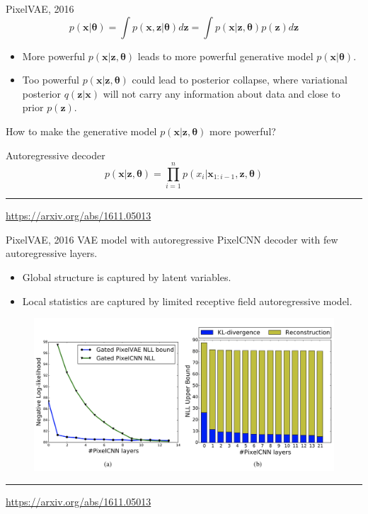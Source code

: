 \documentclass{beamer}
\newcommand{\bx}{\mathbf{x}}
\newcommand{\bz}{\mathbf{z}}
\newcommand{\btheta}{\boldsymbol{\theta}}
\begin{document}
\begin{frame}{PixelVAE, 2016}
	\[
	    p(\bx | \btheta) = \int p(\bx, \bz | \btheta) d \bz = \int p(\bx | \bz, \btheta) p(\bz) d \bz 
	\]
	\begin{itemize}
		\item More powerful $p(\bx | \bz, \btheta)$ leads to more powerful generative model $p(\bx | \btheta)$.
		\item Too powerful $p(\bx | \bz, \btheta)$ could lead to posterior collapse, where variational posterior $q(\bz | \bx)$ will not carry any information about data and close to prior $p(\bz)$.
	\end{itemize}
	How to make the generative model $p(\bx | \bz, \btheta)$ more powerful?
	\begin{block}{Autoregressive decoder}
	\[
	    p(\bx | \bz , \btheta) = \prod_{i=1}^n p(x_i | \bx_{1:i - 1}, \bz , \btheta)
	\]
	\end{block}
	
	\vfill
	\hrule\medskip
	{\scriptsize \href{https://arxiv.org/abs/1611.05013}{https://arxiv.org/abs/1611.05013}}
\end{frame}
\begin{frame}{PixelVAE, 2016}
	VAE model with autoregressive PixelCNN decoder with few autoregressive layers. 
	\begin{itemize}
		\item Global structure is captured by latent variables.
		\item Local statistics are captured by limited receptive field autoregressive model.
	\end{itemize}
	\begin{figure}
	    \centering
	    \includegraphics[width=0.8\linewidth]{figs/PixelVAE_2.png}
	\end{figure}
	\vfill
	\hrule\medskip
	{\scriptsize \href{https://arxiv.org/abs/1611.05013}{https://arxiv.org/abs/1611.05013}}
\end{frame}
\end{document}
